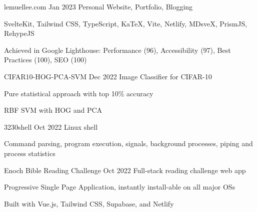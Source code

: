 \jobTitle
{lemuellee.com}
{Jan 2023}
{Personal Website, Portfolio, Blogging}
\begin{descitemize}
    \item SvelteKit, Tailwind CSS, TypeScript, KaTeX, Vite, Netlify, MDsveX, PrismJS, RehypeJS
	\item Achieved in Google Lighthouse: Performance (96), Accessibility (97), Best Practices (100), SEO (100)
\end{descitemize}

\jobTitle
{CIFAR10-HOG-PCA-SVM}
{Dec 2022}
{Image Classifier for CIFAR-10}
\begin{descitemize}
    \item Pure statistical approach with top 10\% accuracy
    \item RBF SVM with HOG and PCA
\end{descitemize}


\jobTitle
{3230shell}
{Oct 2022}
{Linux shell}
\begin{descitemize}
    \item Command parsing, program execution, signals, background processes, piping and process statistics
\end{descitemize}

\jobTitle
{Enoch Bible Reading Challenge}
{Oct 2022}
{Full-stack reading challenge web app}
\begin{descitemize}
	\item Progressive Single Page Application, instantly install-able on all major OSs
    \item Built with Vue.js, Tailwind CSS, Supabase, and Netlify
\end{descitemize}

